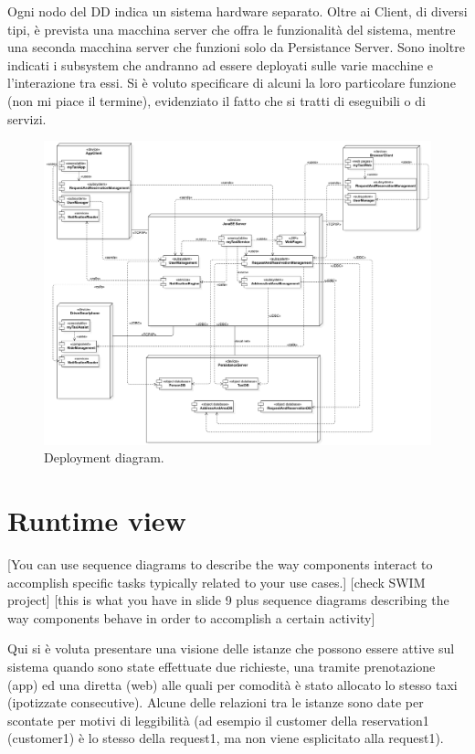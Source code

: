 Ogni nodo del DD indica un sistema hardware separato. Oltre ai Client, di diversi tipi, è prevista una macchina server che offra le funzionalità del sistema, mentre una seconda macchina server che funzioni solo da Persistance Server.
Sono inoltre indicati i subsystem che andranno ad essere deployati sulle varie macchine e l’interazione tra essi. Si è voluto specificare di alcuni la loro particolare funzione (non mi piace il termine), evidenziato il fatto che si tratti di eseguibili o di servizi.


\begin{figure}
	\includegraphics[width=\textwidth]{img/Deploy__DeploymentDiagram_4}
	\caption{Deployment diagram.}
	\label{img:deployment}
\end{figure}











\clearpage%
\section{Runtime view}\label{sec:runtime}
[You can use sequence diagrams to describe the way components interact to accomplish specific tasks typically related to your use cases.]
[check SWIM project]
[this is what you have in slide 9 plus sequence diagrams describing the way components behave in order to accomplish a certain activity]

Qui si è voluta presentare una visione delle istanze che possono essere attive sul sistema quando sono state effettuate due richieste, una tramite prenotazione (app) ed una diretta (web) alle quali per comodità è stato allocato lo stesso taxi (ipotizzate consecutive).
Alcune delle relazioni tra le istanze sono date per scontate per motivi di leggibilità (ad esempio il customer della reservation1 (customer1) è lo stesso della request1, ma non viene esplicitato alla request1).


